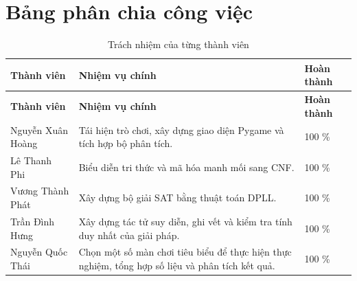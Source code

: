 \section{Bảng phân chia công việc}

\begingroup
\small\linespread{1.15}\selectfont
\begin{longtable}{@{}p{}p{}p{}@{}}
\caption{Trách nhiệm của từng thành viên}\label{tab:tasks}\\
\toprule
\textbf{Thành viên} & \textbf{Nhiệm vụ chính} & \textbf{Hoàn thành} \\
\midrule
\endfirsthead
\toprule
\textbf{Thành viên} & \textbf{Nhiệm vụ chính} & \textbf{Hoàn thành} \\
\midrule
\endhead
Nguyễn Xuân Hoàng & Tái hiện trò chơi, xây dựng giao diện Pygame và tích hợp bộ phân tích. & 100 \% \\
\addlinespace
Lê Thanh Phi & Biểu diễn tri thức và mã hóa manh mối sang CNF. & 100 \% \\
\addlinespace
Vương Thành Phát & Xây dựng bộ giải SAT bằng thuật toán DPLL. & 100 \% \\
\addlinespace
Trần Đình Hưng & Xây dựng tác tử suy diễn, ghi vết và kiểm tra tính duy nhất của giải pháp. & 100 \% \\
\addlinespace
Nguyễn Quốc Thái & Chọn một số màn chơi tiêu biểu để thực hiện thực nghiệm, tổng hợp số liệu và phân tích kết quả. & 100 \% \\
\bottomrule
\end{longtable}
\endgroup